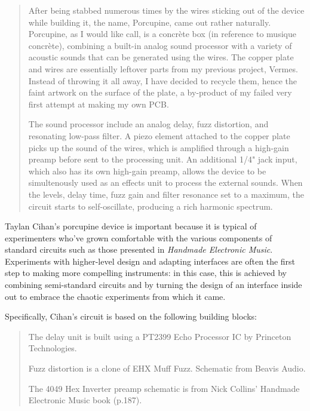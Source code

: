 \begin{quote}
	
	After being stabbed numerous times by the wires sticking out of the device while building it, the name, Porcupine, came out rather naturally. Porcupine, as I would like call, is a concrète box (in reference to musique concrète), combining a built-in analog sound processor with a variety of acoustic sounds that can be generated using the wires. The copper plate and wires are essentially leftover parts from my previous project, Vermes. Instead of throwing it all away, I have decided to recycle them, hence the faint artwork on the surface of the plate, a by-product of my failed very first attempt at making my own PCB.

	The sound processor include an analog delay, fuzz distortion, and resonating low-pass filter. A piezo element attached to the copper plate picks up the sound of the wires, which is amplified through a high-gain preamp before sent to the processing unit. An additional 1/4" jack input, which also has its own high-gain preamp, allows the device to be simultenously used as an effects unit to process the external sounds. When the levels, delay time, fuzz gain and filter resonance set to a maximum, the circuit starts to self-oscillate, producing a rich harmonic spectrum.
	
	\end{quote}
	
	\citep{cihan2015}
	

Taylan Cihan's porcupine device is important because it is typical of experimenters who've grown comfortable with the various components of standard circuits such as those presented in \emph{Handmade Electronic Music}. Experiments with higher-level design and adapting interfaces are often the first step to making more compelling instruments: in this case, this is achieved by combining semi-standard circuits and by turning the design of an interface inside out to embrace the chaotic experiments from which it came. 

Specifically, Cihan's circuit is based on the following building blocks: 
	
\begin{quote}
		
The delay unit is built using a PT2399 Echo Processor IC by Princeton Technologies.

Fuzz distortion is a clone of EHX Muff Fuzz. Schematic from Beavis Audio.

The 4049 Hex Inverter preamp schematic is from Nick Collins' Handmade Electronic Music book (p.187).
	
	\end{quote}

